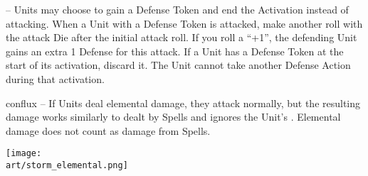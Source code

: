 \begin{multicols*}{2}
\textbf{}  – Units may choose to gain a Defense Token and end the Activation instead of attacking.
When a Unit with a Defense Token is attacked, make another roll with the attack Die after the initial attack roll.
If you roll a ``+1'', the defending Unit gains an extra 1 Defense for this attack.
If a Unit has a Defense Token at the start of its activation, discard it.
The Unit cannot take another Defense Action during that activation.\par
\begin{expansion}{conflux}
  \textbf{} – If Units deal elemental damage, they attack normally, but the resulting damage works similarly to  dealt by Spells and ignores the Unit's .
  Elemental damage does not count as damage from Spells.
\end{expansion}

\vspace*{\fill}
\begin{center}
  \hspace*{-2em}\texttt{[image: \\art/storm\_elemental.png]}
\end{center}
\end{multicols*}

